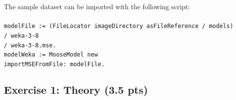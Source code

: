 \documentclass [11pt, a4wide, twoside]{article}
\begin{document}
\noindent The sample dataset can be imported with the following script:\\\\
\texttt{modelFile := (FileLocator imageDirectory asFileReference / \textquotesingle models\textquotesingle)\\
\hspace*{0.5cm}/ \textquotesingle weka-3-8\textquotesingle\\
\hspace*{0.5cm}/ \textquotesingle weka-3-8.mse\textquotesingle.\\
modelWeka := MooseModel new\\
\hspace*{0.5cm}importMSEFromFile: modelFile.}

\newpage

\subsection*{Exercise 1: Theory (3.5 pts)}
\end{document}
